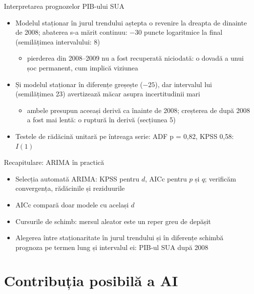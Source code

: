 \begin{frame}{Interpretarea prognozelor PIB-ului SUA}
\itemsize{\small}
\begin{itemize}
    \item Modelul staționar în jurul trendului aștepta o revenire la dreapta de dinainte de 2008; abaterea s-a mărit continuu: $\ensuremath{-}30$ puncte logaritmice la final (semilățimea intervalului: 8)
    \begin{itemize}
        \item pierderea din 2008--2009 nu a fost recuperată niciodată: o dovadă a unui șoc permanent, cum implică viziunea 
    \end{itemize}
    \item Și modelul staționar în diferențe greșește ($\ensuremath{-}25$), dar intervalul lui (semilățimea 23) avertizează măcar asupra incertitudinii mari
    \begin{itemize}
        \item ambele presupun aceeași derivă ca înainte de 2008; creșterea de după 2008 a fost mai lentă: o ruptură în derivă (secțiunea 5)
    \end{itemize}
    \item Testele de rădăcină unitară pe întreaga serie: ADF p = 0{,}82, KPSS 0{,}58: $I(1)$
\end{itemize}
\end{frame}

\begin{frame}{Recapitulare: ARIMA în practică}
\itemsize{\small}
\begin{itemize}
    \item Selecția automată ARIMA: KPSS pentru $d$, AICc pentru $p$ și $q$; verificăm convergența, rădăcinile și reziduurile
    \item AICc compară doar modele cu același $d$
    \item Cursurile de schimb: mersul aleator este un reper greu de depășit 
    \item Alegerea între staționaritate în jurul trendului și în diferențe schimbă prognoza pe termen lung și intervalul ei: PIB-ul SUA după 2008
\end{itemize}
\end{frame}


\section{Contribuția posibilă a AI}

